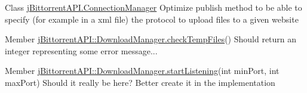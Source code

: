 \label{todo__todo000001}
\hypertarget{todo__todo000001}{}
 
\begin{DoxyDescription}
\item[Class \hyperlink{classj_bittorrent_a_p_i_1_1_connection_manager}{jBittorrentAPI.ConnectionManager} ]Optimize publish method to be able to specify (for example in a xml file) the protocol to upload files to a given website 
\end{DoxyDescription}

\label{todo__todo000003}
\hypertarget{todo__todo000003}{}
 
\begin{DoxyDescription}
\item[Member \hyperlink{classj_bittorrent_a_p_i_1_1_download_manager_a8eb7c238409f2d32b62aef6a7a02bbcb}{jBittorrentAPI::DownloadManager.checkTempFiles}() ]Should return an integer representing some error message... 
\end{DoxyDescription}

\label{todo__todo000002}
\hypertarget{todo__todo000002}{}
 
\begin{DoxyDescription}
\item[Member \hyperlink{classj_bittorrent_a_p_i_1_1_download_manager_aef5ce5f1d5f07d30b00f18d52b52c0ec}{jBittorrentAPI::DownloadManager.startListening}(int minPort, int maxPort) ]Should it really be here? Better create it in the implementation 
\end{DoxyDescription}